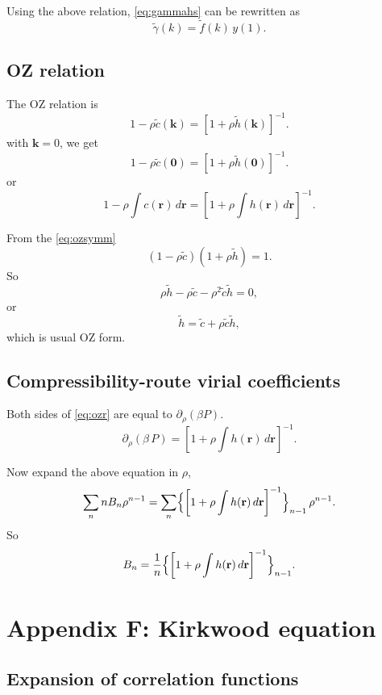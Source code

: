 \documentclass[aip,jcp,reprint,superscriptaddress]{revtex4-1}
\numberwithin{equation}{subsection}
\newcommand{\vct}[1]{\mathbf{#1}}
\providecommand{\vr}{} %
\renewcommand{\vr}{\vct{r}}
\newcommand{\vk}{\vct{k}}
\begin{document}
Using the above relation, \eqref{eq:gammahs}
can be rewritten as
\[
  \tilde{\gamma}(k) = \tilde{f}(k) \, y(1).
\]




\subsection{OZ relation}

The OZ relation is
\begin{equation}
  1 - \rho \tilde c(\vk)
=
 [1 + \rho \tilde h(\vk)]^{-1}.
 \label{eq:ozsymm}
\end{equation}
%
with $\vk = 0$, we get
\[
  1 - \rho \tilde c(\vct 0)
=
 [1 + \rho \tilde h(\vct 0)]^{-1}.
\]
or
\begin{equation}
  1 - \rho \int c(\vr) \, d\vr
=
 \left[1 + \rho \int h(\vr) \, d\vr \right]^{-1}.
 \label{eq:ozr}
\end{equation}


From the \eqref{eq:ozsymm}
\[
  (1 - \rho \tilde{c}) (1 + \rho \tilde{h}) = 1.
\]
So
\[
  \rho \tilde{h} - \rho \tilde{c} - \rho^2 \tilde{c} \tilde{h} = 0,
\]
or
\[
   \tilde{h} = \tilde{c} + \rho \tilde{c} \tilde{h},
\]
which is usual OZ form.



\subsection{Compressibility-route virial coefficients}
Both sides of \eqref{eq:ozr}
are equal to $\partial_\rho (\beta P)$.
\begin{equation*}
  \partial_\rho (\beta \, P)
=
 \left[1 + \rho \int h(\vr) \, d\vr \right]^{-1}.
\end{equation*}

Now expand the above equation in $\rho$,
\[
  \sum_n n B_n \rho^{n-1}
=
  \sum_n
  \Bigl\{
    \left[1 + \rho \int h(\vr) \, d\vr \right]^{-1}
  \Bigr\}_{n - 1} \, \rho^{n-1}.
\]
So
\[
  B_n
=
\frac{1}{n}
  \Bigl\{
    \left[1 + \rho \int h(\vr) \, d\vr \right]^{-1}
  \Bigr\}_{n - 1}.
\]



\section{Appendix F: Kirkwood equation}

\subsection{Expansion of correlation functions}
\end{document}
